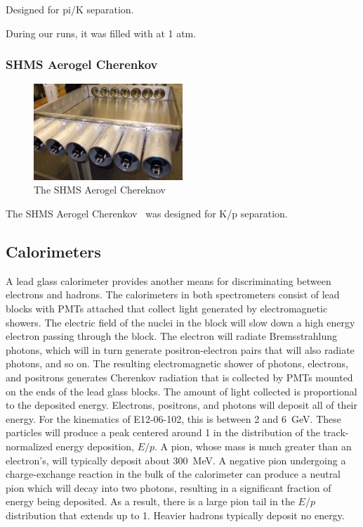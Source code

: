 Designed for pi/K separation.

During our runs, it was filled with  at 1 atm.

\subsubsection{SHMS Aerogel Cherenkov}
\begin{figure}[ht]
    \centering
    \includegraphics[width=0.5\textwidth]{chap3/shms_aerogel_open.jpg}
    \caption{The SHMS Aerogel Chereknov }
    \label{fig:shms_aerogel}
\end{figure}

The SHMS Aerogel Cherenkov~\cite{Horn_2017} was designed for K/p separation.

\subsection{Calorimeters}
A lead glass calorimeter provides another means for discriminating between
electrons and hadrons.
The calorimeters in both spectrometers consist of lead blocks with
PMTs attached that collect light generated by electromagnetic showers.
The electric field of the nuclei in the block will slow down a high energy
electron passing through the block.
The electron will radiate Bremsstrahlung photons, which will in turn generate
positron-electron pairs that will also radiate photons, and so on.
The resulting electromagnetic shower of photons, electrons, and positrons
generates Cherenkov radiation that is collected by PMTs mounted on the ends
of the lead glass blocks.
The amount of light collected is proportional to the deposited energy.
Electrons, positrons, and photons will deposit all of their energy.
For the kinematics of E12-06-102, this is between 2 and
\SI{6}{\giga\electronvolt}.
These particles will produce a peak centered around 1 in the distribution of
the track-normalized energy deposition, $E/p$.
A pion, whose mass is much greater than an electron's, will typically deposit
about \SI{300}{\mega\electronvolt}.
A negative pion undergoing a charge-exchange reaction in the bulk of the
calorimeter can produce a neutral pion which will decay into two photons,
resulting in a significant fraction of energy being deposited.
As a result, there is a large pion tail in the $E/p$ distribution that extends
up to 1.
Heavier hadrons typically deposit no energy.

